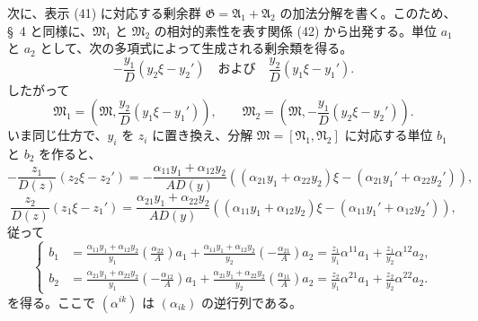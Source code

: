 次に、表示 (41) に対応する剰余群 $\mathfrak G=\mathfrak A_1+\mathfrak A_2$ の加法分解を書く。このため、\S~4 と同様に、$\mathfrak M_1$ と $\mathfrak M_2$ の相対的素性を表す関係 (42) から出発する。単位 $a_1$ と $a_2$ として、次の多項式によって生成される剰余類を得る。
\[
 -\frac{y_1}{D}(y_2\xi-y_2')
 \quad\text{および}\quad
 \frac{y_2}{D}(y_1\xi-y_1').
\]
したがって
\[
 \mathfrak M_1=\left(\mathfrak M,\frac{y_2}{D}(y_1\xi-y_1')\right),
 \qquad
 \mathfrak M_2=\left(\mathfrak M,-\frac{y_1}{D}(y_2\xi-y_2')\right).
\]
いま同じ仕方で、$y_i$ を $z_i$ に置き換え、分解 $\mathfrak M=[\mathfrak N_1,\mathfrak N_2]$ に対応する単位 $b_1$ と $b_2$ を作ると、
\[
 -\frac{z_1}{D(z)}(z_2\xi-z_2')
 =-\frac{\alpha_{11}y_1+\alpha_{12}y_2}{AD(y)}
 ((\alpha_{21}y_1+\alpha_{22}y_2)\xi-(\alpha_{21}y_1'+\alpha_{22}y_2')),
\]
\[
 \frac{z_2}{D(z)}(z_1\xi-z_1')
 =\frac{\alpha_{21}y_1+\alpha_{22}y_2}{AD(y)}
 ((\alpha_{11}y_1+\alpha_{12}y_2)\xi-(\alpha_{11}y_1'+\alpha_{12}y_2')),
\]
従って
\begin{equation}
\left\{
\begin{aligned}
 b_1&=\frac{\alpha_{11}y_1+\alpha_{12}y_2}{y_1}
 \left(\frac{\alpha_{22}}{A}\right)a_1
 +\frac{\alpha_{11}y_1+\alpha_{12}y_2}{y_2}
 \left(-\frac{\alpha_{21}}{A}\right)a_2
 =\frac{z_1}{y_1}\alpha^{11}a_1+\frac{z_1}{y_2}\alpha^{12}a_2,\\
 b_2&=\frac{\alpha_{21}y_1+\alpha_{22}y_2}{y_1}
 \left(-\frac{\alpha_{12}}{A}\right)a_1
 +\frac{\alpha_{21}y_1+\alpha_{22}y_2}{y_2}
 \left(\frac{\alpha_{11}}{A}\right)a_2
 =\frac{z_2}{y_1}\alpha^{21}a_1+\frac{z_2}{y_2}\alpha^{22}a_2.
\end{aligned}\right.
\tag{43}
\end{equation}
を得る。ここで $(\alpha^{ik})$ は $(\alpha_{ik})$ の逆行列である。

